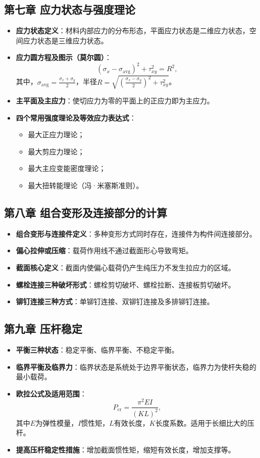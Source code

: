 \documentclass[12pt,a4paper]{article}
\begin{document}
\subsection*{第七章 应力状态与强度理论}
\begin{itemize}
  \item \textbf{应力状态定义}：材料内部应力的分布形态，平面应力状态是二维应力状态，空间应力状态是三维应力状态。
  \item \textbf{应力圆方程及图示（莫尔圆）}：
  \[
    (\sigma_x - \sigma_{\text{avg}})^2 + \tau_{xy}^2 = R^2,
  \]
  其中，$\sigma_{\text{avg}} = \frac{\sigma_x + \sigma_y}{2}$，半径$R = \sqrt{\left(\frac{\sigma_x - \sigma_y}{2}\right)^2 + \tau_{xy}^2}$。
  \item \textbf{主平面及主应力}：使切应力为零的平面上的正应力即为主应力。
  \item \textbf{四个常用强度理论及等效应力表达式}：
    \begin{itemize}
      \item 最大正应力理论；
      \item 最大剪应力理论；
      \item 最大主应变能密度理论；
      \item 最大扭转能理论（冯·米塞斯准则）。
    \end{itemize}
\end{itemize}

\subsection*{第八章 组合变形及连接部分的计算}
\begin{itemize}
  \item \textbf{组合变形与连接件定义}：多种变形方式同时存在，连接件为构件间连接部分。
  \item \textbf{偏心拉伸或压缩}：载荷作用线不通过截面形心导致弯矩。
  \item \textbf{截面核心定义}：截面内使偏心载荷仍产生纯压力不发生拉应力的区域。
  \item \textbf{螺栓连接三种破坏形式}：螺栓剪切破坏、螺栓拉断、连接板剪切破坏。
  \item \textbf{铆钉连接三种方式}：单铆钉连接、双铆钉连接及多排铆钉连接。
\end{itemize}

\subsection*{第九章 压杆稳定}
\begin{itemize}
  \item \textbf{平衡三种状态}：稳定平衡、临界平衡、不稳定平衡。
  \item \textbf{临界平衡及临界力}：临界状态是系统处于边界平衡状态，临界力为使杆失稳的最小载荷。
  \item \textbf{欧拉公式及适用范围}：
  \[
  P_{\text{cr}} = \frac{\pi^2 EI}{(KL)^2},
  \]
  其中$E$为弹性模量，$I$惯性矩，$L$有效长度，$K$长度系数。适用于长细比大的压杆。
  \item \textbf{提高压杆稳定性措施}：增加截面惯性矩，缩短有效长度，增加支撑等。
\end{itemize}
\end{document}
